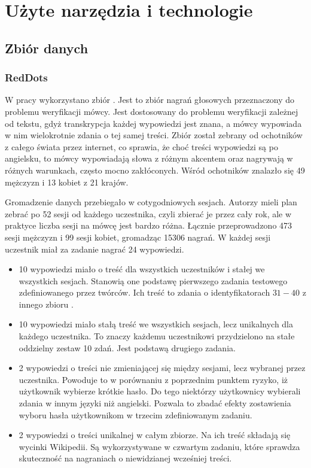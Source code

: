\chapter{Użyte narzędzia i technologie}\label{chap:technologie}

\section{Zbiór danych}\label{sec:zbior_danych}

\subsection{RedDots}

W pracy wykorzystano zbiór \cite{theReddotsDataCollection}.
Jest to zbiór nagrań głosowych przeznaczony do problemu weryfikacji mówcy.
Jest dostosowany do problemu weryfikacji zależnej od tekstu, gdyż transkrypcja każdej wypowiedzi jest znana,
a mówcy wypowiada w nim wielokrotnie zdania o tej samej treści. Zbiór został zebrany od ochotników z całego
świata przez internet, co sprawia, że choć treści wypowiedzi są po angielsku, to mówcy wypowiadają słowa
z różnym akcentem oraz nagrywają w różnych warunkach, często mocno zakłóconych. Wśród ochotników znalazło
się 49 mężczyzn i 13 kobiet z 21 krajów.

Gromadzenie danych przebiegało w cotygodniowych sesjach. Autorzy mieli plan zebrać po 52 sesji od każdego uczestnika,
czyli zbierać je przez cały rok, ale w praktyce liczba sesji na mówcę jest bardzo różna. Łącznie przeprowadzono
473 sesji mężczyzn i 99 sesji kobiet, gromadząc 15306 nagrań. W każdej sesji uczestnik miał za zadanie nagrać 24 wypowiedzi.

\begin{itemize}
    \item 10 wypowiedzi miało o treść dla wszystkich uczestników i stałej we wszystkich sesjach. Stanowią one podstawę
        pierwszego zadania testowego zdefiniowanego przez twórców. Ich treść to zdania o identyfikatorach $31-40$
        z innego zbioru .
    \item 10 wypowiedzi miało stałą treść we wszystkich sesjach, lecz unikalnych dla każdego uczestnika. To znaczy
        każdemu uczestnikowi przydzielono na stałe oddzielny zestaw 10 zdań. Jest podstawą drugiego zadania.
    \item 2 wypowiedzi o treści nie zmieniającej się między sesjami, lecz wybranej przez uczestnika. Powoduje
        to w porównaniu z poprzednim punktem ryzyko, iż użytkownik wybierze krótkie hasło. Do tego niektórzy
        użytkownicy wybierali zdania w innym języki niż angielski. Pozwala to zbadać efekty zostawienia wyboru hasła
        użytkownikom w trzecim zdefiniowanym zadaniu.
    \item 2 wypowiedzi o treści unikalnej w całym zbiorze. Na ich treść składają się wycinki Wikipedii. Są wykorzystywane
        w czwartym zadaniu, które sprawdza skuteczność na nagraniach o niewidzianej wcześniej treści.
\end{itemize}

